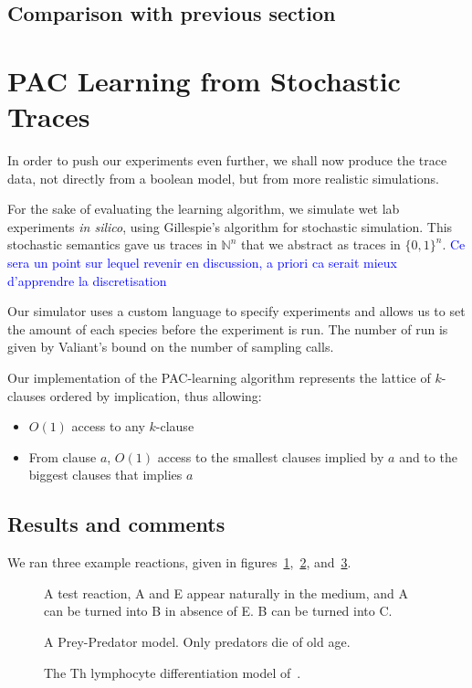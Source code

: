 \documentclass{llncs}
\newcommand{\francois}[1]{\textcolor{blue}{#1}}
\begin{document}
\subsection{Comparison with previous section}

\section{PAC Learning from Stochastic Traces}

In order to push our experiments even further, we shall now produce the trace
data, not directly from a boolean model, but from more realistic simulations.

For the sake of evaluating the learning algorithm,
we simulate wet lab experiments \emph{in silico}, using Gillespie's algorithm for stochastic simulation.
This stochastic semantics gave us traces in ${\mathbb{N}}^n$ that we abstract as traces in ${\{0,1\}}^n$.
\francois{Ce sera un point sur lequel revenir en discussion, a priori ca serait mieux d'apprendre la discretisation}

Our simulator uses a custom language to specify experiments and allows us to set the amount of each species before the experiment is run. The number of run is given by Valiant's bound on the number of sampling calls.

Our implementation of the PAC-learning algorithm represents the lattice of $k$-clauses ordered by implication, thus allowing:
\begin{itemize}
	\item $O(1)$ access to any $k$-clause
	\item From clause $a$, $O(1)$ access to the smallest clauses implied by $a$ and to the biggest clauses that implies $a$
\end{itemize}


\subsection{Results and comments}

We ran three example reactions, given in figures~\ref{test},~\ref{preypred}, and~\ref{lympho}.
\begin{figure}[htbp]
	
	\vspace{-1em}
	\caption{A test reaction, A and E appear naturally in the medium, and A can be turned into B in absence of E. B  can be turned into C.\label{test}}
\end{figure}
\begin{figure}[htbp]
	
	\vspace{-1em}
	\caption{A Prey-Predator model. Only predators die of old age.\label{preypred}}
\end{figure}
\begin{figure}[htbp]
	
	\vspace{-1em}
   \caption{The Th lymphocyte differentiation model of~\cite{RRMTC06tcsb}.\label{lympho}}
\end{figure}
\end{document}
